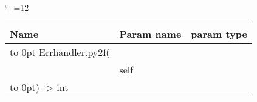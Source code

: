 \begingroup \catcode`\_=12 \tt
\begin{tabular}{lll}
\toprule
\textrm{Name}&\textrm{Param name}&\textrm{param type}\\
\midrule
\hbox to 0pt {Errhandler.py2f(\hss}\\
& self\\
\hbox to 0pt{) -> int\hss}\\
\bottomrule
\end{tabular}
\endgroup
